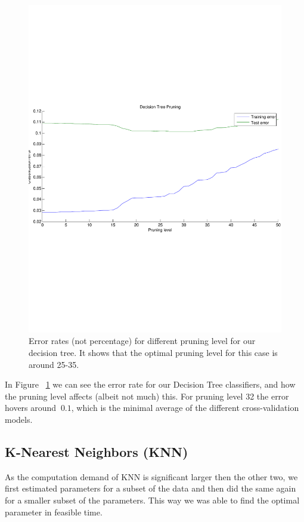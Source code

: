 \begin{figure}[H]
\centering
\includegraphics[width=0.6\linewidth, trim= 0mm 70mm 0mm 70mm, clip]{code/decision_tree_pruning}
\caption{Error rates (not percentage) for different pruning level for our decision tree. It shows that the optimal pruning level for this case is around 25-35.}
\label{fig:dec_tree}
\end{figure}

In Figure ~\ref{fig:dec_tree} we can see the error rate for our Decision Tree classifiers, and how the pruning level affects (albeit not much) this. For pruning level 32 the error hovers around $~0.1$, which is the minimal average of the different cross-validation models.

\subsection{K-Nearest Neighbors (KNN)}
As the computation demand of KNN is significant larger then the other two, we first estimated parameters for a subset of the data and then did the same again for a smaller subset of the parameters. This way we was able to find the optimal parameter in feasible time.

